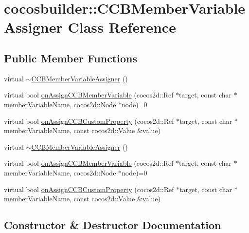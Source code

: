 \hypertarget{classcocosbuilder_1_1CCBMemberVariableAssigner}{}\section{cocosbuilder\+:\+:C\+C\+B\+Member\+Variable\+Assigner Class Reference}
\label{classcocosbuilder_1_1CCBMemberVariableAssigner}
\subsection*{Public Member Functions}
\begin{DoxyCompactItemize}
\item 
virtual \hyperlink{classcocosbuilder_1_1CCBMemberVariableAssigner_a27e33f86d63e115ecca4f586e2b116e1}{$\sim$\+C\+C\+B\+Member\+Variable\+Assigner} ()
\item 
virtual bool \hyperlink{classcocosbuilder_1_1CCBMemberVariableAssigner_ae715fe3339fbb087a9bbc2b9abd25450}{on\+Assign\+C\+C\+B\+Member\+Variable} (cocos2d\+::\+Ref $\ast$target, const char $\ast$member\+Variable\+Name, cocos2d\+::\+Node $\ast$node)=0
\item 
virtual bool \hyperlink{classcocosbuilder_1_1CCBMemberVariableAssigner_a2e5db207629039604fe223bd15cdf55d}{on\+Assign\+C\+C\+B\+Custom\+Property} (cocos2d\+::\+Ref $\ast$target, const char $\ast$member\+Variable\+Name, const cocos2d\+::\+Value \&value)
\item 
virtual \hyperlink{classcocosbuilder_1_1CCBMemberVariableAssigner_a27e33f86d63e115ecca4f586e2b116e1}{$\sim$\+C\+C\+B\+Member\+Variable\+Assigner} ()
\item 
virtual bool \hyperlink{classcocosbuilder_1_1CCBMemberVariableAssigner_ae715fe3339fbb087a9bbc2b9abd25450}{on\+Assign\+C\+C\+B\+Member\+Variable} (cocos2d\+::\+Ref $\ast$target, const char $\ast$member\+Variable\+Name, cocos2d\+::\+Node $\ast$node)=0
\item 
virtual bool \hyperlink{classcocosbuilder_1_1CCBMemberVariableAssigner_a2e5db207629039604fe223bd15cdf55d}{on\+Assign\+C\+C\+B\+Custom\+Property} (cocos2d\+::\+Ref $\ast$target, const char $\ast$member\+Variable\+Name, const cocos2d\+::\+Value \&value)
\end{DoxyCompactItemize}


\subsection{Constructor \& Destructor Documentation}
\mbox{\label{classcocosbuilder_1_1CCBMemberVariableAssigner_a27e33f86d63e115ecca4f586e2b116e1}} 
